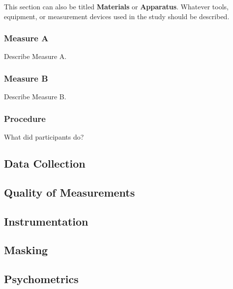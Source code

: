 \documentclass[
  floatsintext,
  man,
  colorlinks=true,linkcolor=blue,citecolor=blue,urlcolor=blue,biblatex]{apa7}
\begin{document}
This section can also be titled \textbf{Materials} or
\textbf{Apparatus}. Whatever tools, equipment, or measurement devices
used in the study should be described.

\hypertarget{measure-a}{%
\subsubsection{Measure A}\label{measure-a}}

Describe Measure A.

\hypertarget{measure-b}{%
\subsubsection{Measure B}\label{measure-b}}

Describe Measure B.

\hypertarget{procedure}{%
\subsubsection{Procedure}\label{procedure}}

What did participants do?

\hypertarget{data-collection}{%
\subsection{Data Collection}\label{data-collection}}

\hypertarget{quality-of-measurements}{%
\subsection{Quality of Measurements}\label{quality-of-measurements}}

\hypertarget{instrumentation}{%
\subsection{Instrumentation}\label{instrumentation}}

\hypertarget{masking}{%
\subsection{Masking}\label{masking}}

\hypertarget{psychometrics}{%
\subsection{Psychometrics}\label{psychometrics}}
\end{document}
